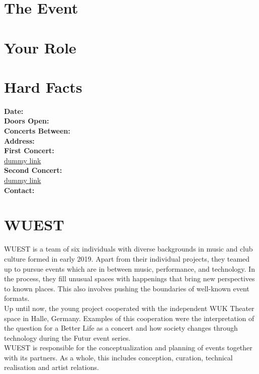 \documentclass[a4paper, 11pt]{article}
\begin{document}
\pagestyle{empty}

\section*{The Event}

\section*{Your Role}

\section*{Hard Facts}

\begin{multicols}{2}

\textbf{Date:} \\
\textbf{Doors Open:} \\
\textbf{Concerts Between:} \\
\textbf{Address:} \\
\textbf{First Concert:} \\
\href{www.duckduckgo.com}{dummy link} \\
\textbf{Second Concert:} \\
\href{www.duckduckgo.com}{dummy link} \\
\textbf{Contact:} \\

    
\end{multicols}

\section*{WUEST}
WUEST is a team of six individuals with diverse backgrounds in music and club 
culture formed in early 2019. Apart from their individual projects, they 
teamed up to pursue events which are in between music, performance, and 
technology. In the process, they fill unusual spaces with happenings that 
bring new perspectives to known places. This also involves pushing the boundaries 
of well-known event formats. \\
Up until now, the young project cooperated with the independent WUK Theater space 
in Halle, Germany. Examples of this cooperation were the interpretation of the
question for a Better Life as a concert and how society changes through 
technology during the Futur event series. \\
WUEST is responsible for the conceptualization and planning of events together 
with its partners. As a whole, this includes conception, curation, technical 
realisation and artist relations.
\end{document}

